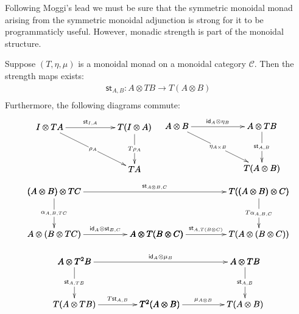 \documentclass{article}
\let\mto\to
\let\to\rightarrow
\newcommand{\cat}[1]{\mathcal{#1}}
\newcommand{\st}[1]{\mathsf{st}_{#1}}
\newcommand{\id}[0]{\mathsf{id}}
\begin{document}
Following Moggi's \cite{?} lead we must be sure that the symmetric
monoidal monad arising from the symmetric monoidal adjunction is
strong for it to be programmaticly useful.  However, monadic strength
is part of the monoidal structure.
\begin{lemma}
  \label{lemma:monadic-strength}
  Suppose $(T,\eta,\mu)$ is a monoidal monad on a monoidal category
  $\cat{C}$.  Then the strength maps exists:
  \[
  \begin{array}{lll}
    \st{A,B} : A \otimes TB \mto T (A \otimes B)\\    
  \end{array}
  \]
  Furthermore, the following diagrams commute:
  \[
  \begin{array}{lll}
    \bfig
    \qtriangle|amm|<1000,500>[
      I \otimes TA`
      T(I \otimes A)`
      TA;
      \st{I,A}`
      \rho_A`
      T\rho_A]
    \efig
    &
    \bfig
    \qtriangle|amm|<1000,500>[
      A \otimes B`
      A \otimes TB`
      T(A \otimes B);
      \id_A \otimes \eta_B`
      \eta_{A \times B}`
      \st{A,B}]    
    \efig       
  \end{array}
  \]
  \[
  \begin{array}{cccccccccc}
    \bfig
    \square|mmaa|/`->``->/<1200,500>[
      (A \otimes B) \otimes TC``
      A \otimes (B \otimes TC)`
      A \otimes T(B \otimes C);`
      \alpha_{A,B,TC}``
      \id_A \otimes \st{B,C}]

    \square(1200,0)|mmma|/``->`->/<1200,500>[`
      T((A \otimes B) \otimes C)`
      A \otimes T(B \otimes C)`
      T(A \otimes (B \otimes C));``
      T\alpha_{A,B,C}`
      \st{A,T(B \otimes C)}]

    \morphism(0,500)<2400,0>[
      (A \otimes B) \otimes TC`
      T((A \otimes B) \otimes C);
      \st{A \otimes B,C}]
    \efig        
    \\\\
    \bfig
    \square|mmaa|/`->``->/<1000,500>[
      A \otimes T^2 B``
      T(A \otimes TB)`
      T^2(A \otimes B);`
      \st{A,TB}``
      T\st{A,B}]
    
    \square(1000,0)|mmma|/``->`->/<1000,500>[`
      A \otimes TB`
      T^2(A \otimes B)`
      T(A \otimes B);``
      \st{A,B}`
      \mu_{A \otimes B}]

    \morphism(0,500)<2000,0>[
      A \otimes T^2 B`
      A \otimes TB;
      \id_{A} \otimes \mu_B]
    \efig        
  \end{array}
  \]
\end{lemma}
\end{document}
